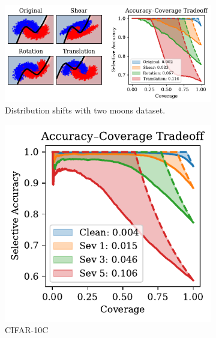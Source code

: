 \begin{figure}[t]
  \centering
  \begin{subfigure}[t]{0.49\textwidth}
  \centering
    \includegraphics[width=\linewidth]{figs/sc_bounds/2moons_shift.pdf}%
    \caption{Distribution shifts with two moons dataset.}
    \label{fig:left}
  \end{subfigure}%
  \begin{subfigure}[t]{0.24\textwidth}
    \centering
    \includegraphics[width=\linewidth]{figs/sc_bounds/cifar10c_tradeoffs.pdf} 
    \caption{CIFAR-10C}
    \label{fig:right}
  \end{subfigure}
  \begin{subfigure}[t]{0.24\textwidth}
    \centering

\end{subfigure}
\end{figure}
